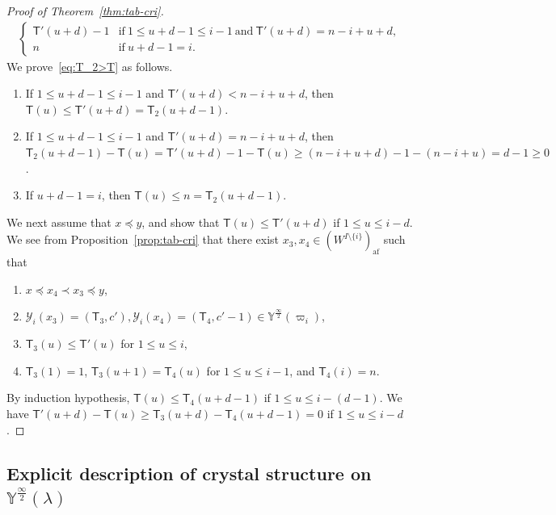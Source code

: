 \documentclass[ALCO,ThmDefs,Unicode,epreuves]{cedram}
\newcommand{\si}{\frac{\infty}{2}}
\DeclareMathOperator{\af}{af}
\begin{document}
\begin{proof}[Proof of Theorem~\ref{thm:tab-cri}]
\begin{multline}
\begin{cases}
\mathsf{T}'(u+d) -1
&
\text{if} \ 
1 \leq u+d-1 \leq i-1 \ 
\text{and} \ 
\mathsf{T}'(u+d) = n-i+u+d , \\%
n
&
\text{if} \ 
u+d-1 = i .
\end{cases}
\end{multline}
We prove~\eqref{eq:T_2>T} as follows. 
\begin{enumerate}[label=(\arabic*)]
\item
If
$1 \leq u+d-1 \leq i-1$ 
and 
$\mathsf{T}'(u+d) < n-i+u+d$, 
then 
$\mathsf{T}(u) \leq \mathsf{T}'(u+d) = \mathsf{T}_2(u+d-1)$. 
\item
If
$1 \leq u+d-1 \leq i-1$ 
and 
$\mathsf{T}'(u+d) = n-i+u+d$, 
then 
$\mathsf{T}_2(u+d-1) - \mathsf{T}(u) 
= 
\mathsf{T}'(u+d) - 1 - \mathsf{T}(u)
\geq 
(n-i+u+d) - 1 - (n-i+u)
= d - 1 \geq 0$.
\item
If 
$u+d-1 = i$, 
then 
$\mathsf{T}(u) \leq n = \mathsf{T}_2(u+d-1)$.
\end{enumerate}

We next assume that 
$x \preceq y$, 
and show that
$\mathsf{T}(u) \leq \mathsf{T}'(u+d)$ 
if 
$1 \leq u \leq i-d$. 
We see from Proposition~\ref{prop:tab-cri} that 
there exist 
$x_3 , x_4 \in (W^{I \setminus \{ i \}})_{\af}$ 
such that 
\begin{enumerate}[label=(\arabic*)]
\item
$x \preceq x_4 \prec x_3 \preceq y$, 
\item
$\mathcal{Y}_i(x_3) = (\mathsf{T}_3 , c') , \mathcal{Y}_i(x_4) = (\mathsf{T}_4 , c'-1) \in \mathbb{Y}^{\si}(\varpi_i)$, 
\item
$\mathsf{T}_3(u) \leq \mathsf{T}'(u)$ 
for 
$1 \leq u \leq i$, 
\item
$\mathsf{T}_3(1) = 1$, 
$\mathsf{T}_3(u+1) = \mathsf{T}_4(u)$ 
for 
$1 \leq u \leq i-1$, 
and 
$\mathsf{T}_4(i) = n$. 
\end{enumerate}
By induction hypothesis, 
$\mathsf{T}(u) \leq \mathsf{T}_4(u+d-1)$ 
if 
$1 \leq u \leq i - (d-1)$. 
We have 
$\mathsf{T}'(u+d) - \mathsf{T}(u) \geq \mathsf{T}_3(u+d) - \mathsf{T}_4(u+d-1) = 0$ 
if 
$1 \leq u \leq i-d$. 
\end{proof}

\subsection{Explicit description of crystal structure on \texorpdfstring{$\mathbb{Y}^{\si}(\lambda)$}{Y (infty/2)(lambda)}}
\end{document}
